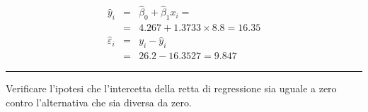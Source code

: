 \documentclass[
  11pt,
]{book}
\theoremstyle{mytheoremstyle}
\theoremstyle{mydefstyle}
\newenvironment{sol}
  {
  \begin{tcolorbox}[enhanced,breakable,arc=0.1mm,boxrule=1pt,colback=white,colframe=iblue,
  title=\bf \fontfamily{lmss}\selectfont \hspace{.5 cm} Soluzione,drop fuzzy shadow]

}{
\end{tcolorbox}
  }
\begin{document}
\begin{sol}
\begin{eqnarray*}
\hat y_i &=&\hat\beta_0+\hat\beta_1 x_i=\\ 
&=& 4.267 + 1.3733 \times 8.8 = 16.35 \\ 
\hat \varepsilon_i &=& y_i-\hat y_i\\ 
&=& 26.2 - 16.3527 = 9.847  
\end{eqnarray*}

\end{sol}

\begin{center}\rule{0.5\linewidth}{0.5pt}\end{center}

Verificare l'ipotesi che l'intercetta della retta di regressione sia uguale a
zero contro l'alternativa che sia diversa da zero.
\end{document}
